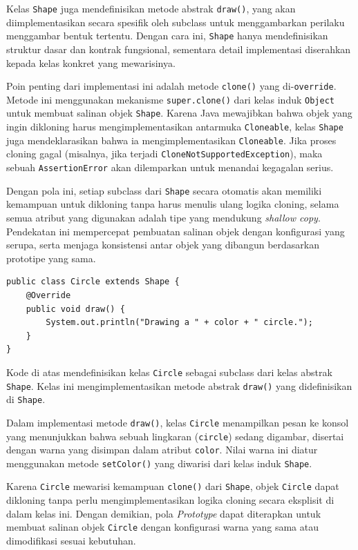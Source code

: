 Kelas \texttt{Shape} juga mendefinisikan metode abstrak \texttt{draw()}, yang akan diimplementasikan secara spesifik oleh subclass untuk menggambarkan perilaku menggambar bentuk tertentu. Dengan cara ini, \texttt{Shape} hanya mendefinisikan struktur dasar dan kontrak fungsional, sementara detail implementasi diserahkan kepada kelas konkret yang mewarisinya.

Poin penting dari implementasi ini adalah metode \texttt{clone()} yang di-\texttt{override}. Metode ini menggunakan mekanisme \texttt{super.clone()} dari kelas induk \texttt{Object} untuk membuat salinan objek \texttt{Shape}. Karena Java mewajibkan bahwa objek yang ingin dikloning harus mengimplementasikan antarmuka \texttt{Cloneable}, kelas \texttt{Shape} juga mendeklarasikan bahwa ia mengimplementasikan \texttt{Cloneable}. Jika proses cloning gagal (misalnya, jika terjadi \texttt{CloneNotSupportedException}), maka sebuah \texttt{AssertionError} akan dilemparkan untuk menandai kegagalan serius.

Dengan pola ini, setiap subclass dari \texttt{Shape} secara otomatis akan memiliki kemampuan untuk dikloning tanpa harus menulis ulang logika cloning, selama semua atribut yang digunakan adalah tipe yang mendukung \textit{shallow copy}. Pendekatan ini mempercepat pembuatan salinan objek dengan konfigurasi yang serupa, serta menjaga konsistensi antar objek yang dibangun berdasarkan prototipe yang sama.


\begin{lstlisting}[style=JavaStyle, caption={Kelas Circle yang Mengimplementasikan Shape}, label={lst:prototype-circle}]
public class Circle extends Shape {
	@Override
	public void draw() {
		System.out.println("Drawing a " + color + " circle.");
	}
}
\end{lstlisting}

Kode di atas mendefinisikan kelas \texttt{Circle} sebagai subclass dari kelas abstrak \texttt{Shape}. Kelas ini mengimplementasikan metode abstrak \texttt{draw()} yang didefinisikan di \texttt{Shape}. 

Dalam implementasi metode \texttt{draw()}, kelas \texttt{Circle} menampilkan pesan ke konsol yang menunjukkan bahwa sebuah lingkaran (\texttt{circle}) sedang digambar, disertai dengan warna yang disimpan dalam atribut \texttt{color}. Nilai warna ini diatur menggunakan metode \texttt{setColor()} yang diwarisi dari kelas induk \texttt{Shape}.

Karena \texttt{Circle} mewarisi kemampuan \texttt{clone()} dari \texttt{Shape}, objek \texttt{Circle} dapat dikloning tanpa perlu mengimplementasikan logika cloning secara eksplisit di dalam kelas ini. Dengan demikian, pola \textit{Prototype} dapat diterapkan untuk membuat salinan objek \texttt{Circle} dengan konfigurasi warna yang sama atau dimodifikasi sesuai kebutuhan. 

